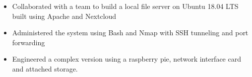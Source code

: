 \documentclass[11pt,a4paper,ragged2e]{altacv}
\begin{document}
\begin{paracol}{1}
\begin{itemize}
\item Collaborated with a team to build a local file server on Ubuntu 18.04 LTS built using Apache and Nextcloud
\item Administered the system using Bash and Nmap with SSH tunneling and port forwarding
\item Engineered a complex version using a raspberry pie, network interface card and attached storage.
\end{itemize}

\medskip

\newline






\end{paracol}
\end{document}
